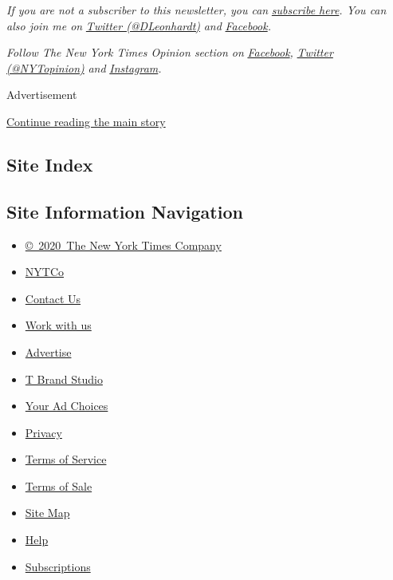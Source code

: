 \emph{If you are not a subscriber to this newsletter, you can}
\href{https://www.nytimes3xbfgragh.onion/newsletters/david-leonhardt}{\emph{subscribe
here}}\emph{. You can also join me on}
\href{https://twitter.com/DLeonhardt}{\emph{Twitter (@DLeonhardt)}}
\emph{and}
\href{https://www.facebookcorewwwi.onion/DavidRLeonhardt/}{\emph{Facebook}}\emph{.}

\emph{Follow The New York Times Opinion section on}
\href{https://www.facebookcorewwwi.onion/nytopinion}{\emph{Facebook}}\emph{,}
\href{http://twitter.com/NYTOpinion}{\emph{Twitter (@NYTopinion)}}
\emph{and}
\href{https://www.instagram.com/nytopinion/}{\emph{Instagram}}\emph{.}

Advertisement

\protect\hyperlink{after-bottom}{Continue reading the main story}

\hypertarget{site-index}{%
\subsection{Site Index}\label{site-index}}

\hypertarget{site-information-navigation}{%
\subsection{Site Information
Navigation}\label{site-information-navigation}}

\begin{itemize}
\tightlist
\item
  \href{https://help.nytimes3xbfgragh.onion/hc/en-us/articles/115014792127-Copyright-notice}{©~2020~The
  New York Times Company}
\end{itemize}

\begin{itemize}
\tightlist
\item
  \href{https://www.nytco.com/}{NYTCo}
\item
  \href{https://help.nytimes3xbfgragh.onion/hc/en-us/articles/115015385887-Contact-Us}{Contact
  Us}
\item
  \href{https://www.nytco.com/careers/}{Work with us}
\item
  \href{https://nytmediakit.com/}{Advertise}
\item
  \href{http://www.tbrandstudio.com/}{T Brand Studio}
\item
  \href{https://www.nytimes3xbfgragh.onion/privacy/cookie-policy\#how-do-i-manage-trackers}{Your
  Ad Choices}
\item
  \href{https://www.nytimes3xbfgragh.onion/privacy}{Privacy}
\item
  \href{https://help.nytimes3xbfgragh.onion/hc/en-us/articles/115014893428-Terms-of-service}{Terms
  of Service}
\item
  \href{https://help.nytimes3xbfgragh.onion/hc/en-us/articles/115014893968-Terms-of-sale}{Terms
  of Sale}
\item
  \href{https://spiderbites.nytimes3xbfgragh.onion}{Site Map}
\item
  \href{https://help.nytimes3xbfgragh.onion/hc/en-us}{Help}
\item
  \href{https://www.nytimes3xbfgragh.onion/subscription?campaignId=37WXW}{Subscriptions}
\end{itemize}
